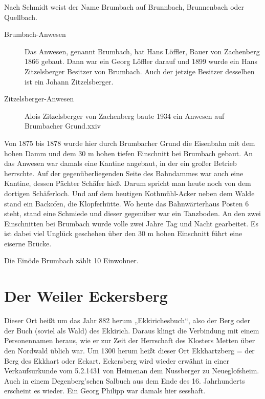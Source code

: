 \documentclass[12pt,a4pager,draft]{book}
\begin{document}
Nach Schmidt weist der Name Brumbach auf Brunnbach, Brunnenbach oder Quellbach.

\begin{description}
\item[Brumbach-Anwesen] Das Anwesen, genannt Brumbach, hat Hans Löffler, Bauer
von Zachenberg 1866 gebaut. Dann war ein Georg Löffler darauf und 1899 wurde ein
Hans Zitzelsberger Besitzer von Brumbach. Auch der jetzige Besitzer desselben
ist ein Johann Zitzelsberger.

\item[Zitzelsberger-Anwesen] Alois Zitzelsberger von Zachenberg baute 1934 ein
Anwesen auf Brumbacher Grund.xxiv
\end{description}

Von 1875 bis 1878 wurde hier durch Brumbacher Grund die Eisenbahn mit dem hohen
Damm und dem 30 m hohen tiefen Einschnitt bei Brumbach gebaut. An das Anwesen
war damals eine Kantine angebaut, in der ein großer Betrieb herrschte. Auf der
gegenüberliegenden Seite des Bahndammes war auch eine Kantine, dessen Pächter
Schäfer hieß. Darum spricht man heute noch von dem dortigen Schäferloch. Und auf
dem heutigen Kothmühl-Acker neben dem Walde stand ein Backofen, die
Klopferhütte. Wo heute das Bahnwärterhaus Posten 6 steht, stand eine Schmiede
und dieser gegenüber war ein Tanzboden. An den zwei Einschnitten bei Brumbach
wurde volle zwei Jahre Tag und Nacht gearbeitet. Es ist dabei viel Unglück
geschehen über den 30 m hohen Einschnitt führt eine eiserne Brücke.

Die Einöde Brumbach zählt 10 Einwohner.

\section{Der Weiler Eckersberg}

Dieser Ort heißt um das Jahr 882 herum „Ekkirichesbuch“, also der Berg oder der
Buch (soviel als Wald) des Ekkirich. Daraus klingt die Verbindung mit einem
Personennamen heraus, wie er zur Zeit der Herrschaft des Klosters Metten über
den Nordwald üblich war. Um 1300 herum heißt dieser Ort Ekkhartzberg = der Berg
des Ekkhart oder Eckart. Eckersberg wird wieder erwähnt in einer Verkaufsurkunde
vom 5.2.1431 von Heimenan dem Nussberger zu Neueglofsheim. Auch in einem
Degenberg'schen Salbuch aus dem Ende des 16. Jahrhunderts erscheint es wieder.
Ein Georg Philipp war damals hier sesshaft.
\end{document}
